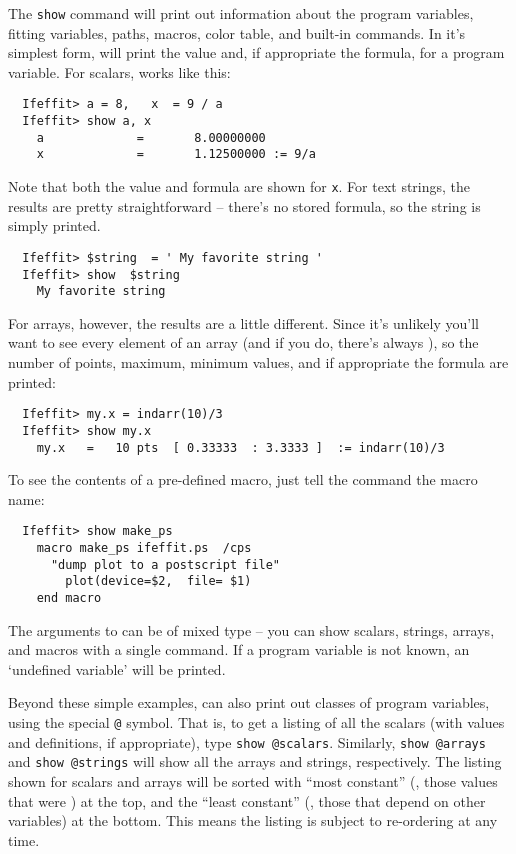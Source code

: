 The {\texttt{show}} command will print out information about the program
variables, fitting variables, paths, macros, color table, and built-in
commands.  In it's simplest form, {} will print the value and, if
appropriate the formula, for a program variable.  For scalars, {}
works like this:
\begin{verbatim}
  Ifeffit> a = 8,   x  = 9 / a
  Ifeffit> show a, x
    a             =       8.00000000
    x             =       1.12500000 := 9/a
\end{verbatim}
\noindent
Note that both the value and formula are shown for {\tt{x}}.  For text
strings, the results are pretty straightforward -- there's no stored
formula, so the string is simply printed.
\begin{verbatim}
  Ifeffit> $string  = ' My favorite string '
  Ifeffit> show  $string
    My favorite string
\end{verbatim}
\noindent
For arrays, however, the results are a little different.  Since it's
unlikely you'll want to see every element of an array (and if you do,
there's always {}), so the number of points, maximum, minimum
values, and if appropriate the formula are printed:
\begin{verbatim}
  Ifeffit> my.x = indarr(10)/3
  Ifeffit> show my.x
    my.x   =   10 pts  [ 0.33333  : 3.3333 ]  := indarr(10)/3
\end{verbatim}
\noindent
To see the contents of a pre-defined macro, just tell the {}
command  the macro name:
\begin{verbatim}
  Ifeffit> show make_ps
    macro make_ps ifeffit.ps  /cps
      "dump plot to a postscript file"
        plot(device=$2,  file= $1)
    end macro
\end{verbatim}
\noindent
The arguments to {} can be of mixed type -- you can show scalars,
strings, arrays, and macros with a single command.  If a program variable
is not known, an `undefined variable' will be printed.

{}
{}


Beyond these simple examples, {} can also print out classes of
program variables, using the special {\tt{@}} symbol.  That is, to get a
listing of all the scalars (with values and definitions, if appropriate),
type {\tt{show @scalars}}.  Similarly, {\tt{show @arrays}} and {\tt{show
    @strings}} will show all the arrays and strings, respectively.  The
listing shown for scalars and arrays will be sorted with ``most constant''
({\ie}, those values that were {}) at the top, and the ``least
constant'' ({\ie}, those that depend on other variables) at the bottom.
This means the listing is subject to re-ordering at any time.


